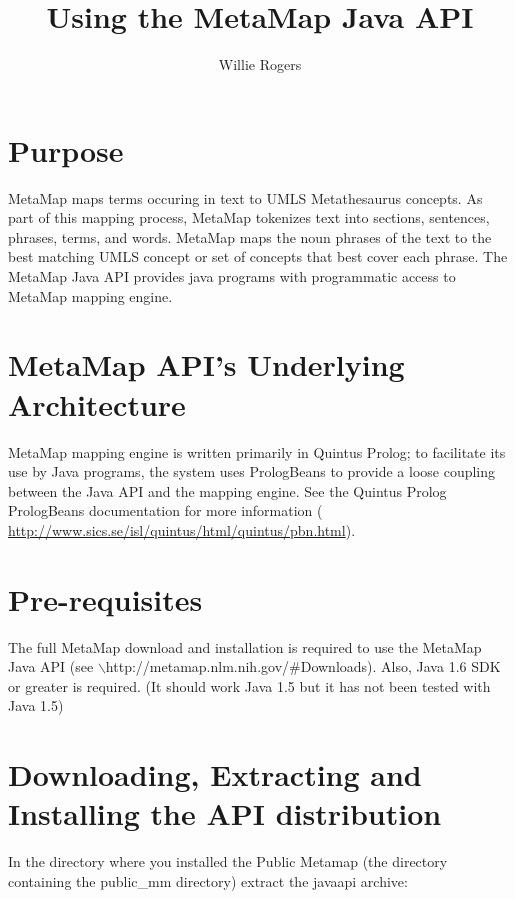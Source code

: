 \documentclass[11pt]{article}
\begin{document}
\title{Using the MetaMap Java API}
\author{Willie Rogers}
\maketitle

\section{Purpose}
\label{Purpose}

MetaMap maps terms occuring in text to UMLS Metathesaurus concepts. As
part of this mapping process, MetaMap tokenizes text into sections,
sentences, phrases, terms, and words. MetaMap maps the noun phrases of
the text to the best matching UMLS concept or set of concepts that
best cover each phrase.  The MetaMap Java API provides java programs
with programmatic access to MetaMap mapping engine.


\section{MetaMap API's Underlying Architecture}
\label{MetaMap API's Underlying Architecture}

MetaMap mapping engine is written primarily in Quintus Prolog; to
facilitate its use by Java programs, the system uses PrologBeans to
provide a loose coupling between the Java API and the mapping engine.
See the Quintus Prolog PrologBeans documentation for more information
( \url{http://www.sics.se/isl/quintus/html/quintus/pbn.html}).


\section{Pre-requisites}
\label{Pre-requisites}

The full MetaMap download and installation is required to use the
MetaMap Java API (see \(\backslash\)http://metamap.nlm.nih.gov/\#Downloads).  Also,
Java 1.6 SDK or greater is required.  (It should work Java 1.5 but it
has not been tested with Java 1.5)


\section{Downloading, Extracting and Installing the API distribution}
\label{Downloading, Extracting and Installing the API distribution}

In the directory where you installed the Public Metamap (the directory
containing the public\_mm directory) extract the javaapi archive:
\end{document}
